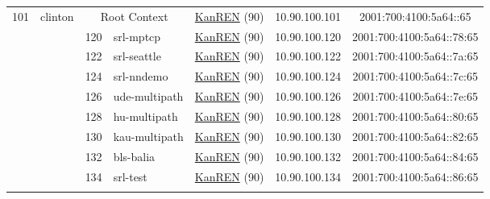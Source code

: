 \begin{small}
\begin{center}
\begin{longtable}{|c|c|c|c|c|c|c|c|}
 \multirow{13}{*}{\tiny{101}} & \multicolumn{1}{|l|}{\multirow{13}{*}{\tiny{clinton}}} & \multicolumn{2}{|c|}{\tiny{Root Context}} & \multicolumn{2}{|c|}{\tiny{\href{http://www.kanren.net}{KanREN} (90)}} & \tiny{10.90.100.101} & \tiny{2001:700:4100:5a64::65} \\* \cline{3-3}\cline{4-4}\cline{5-5}\cline{6-6}\cline{7-7}\cline{8-8}
  &  & \tiny{120} & \multicolumn{1}{|l|}{\tiny{srl-mptcp}} & \multicolumn{2}{|c|}{\tiny{\href{http://www.kanren.net}{KanREN} (90)}} & \tiny{10.90.100.120} & \tiny{2001:700:4100:5a64::78:65} \\* \cline{3-3}\cline{4-4}\cline{5-5}\cline{6-6}\cline{7-7}\cline{8-8}
  &  & \tiny{122} & \multicolumn{1}{|l|}{\tiny{srl-seattle}} & \multicolumn{2}{|c|}{\tiny{\href{http://www.kanren.net}{KanREN} (90)}} & \tiny{10.90.100.122} & \tiny{2001:700:4100:5a64::7a:65} \\* \cline{3-3}\cline{4-4}\cline{5-5}\cline{6-6}\cline{7-7}\cline{8-8}
  &  & \tiny{124} & \multicolumn{1}{|l|}{\tiny{srl-nndemo}} & \multicolumn{2}{|c|}{\tiny{\href{http://www.kanren.net}{KanREN} (90)}} & \tiny{10.90.100.124} & \tiny{2001:700:4100:5a64::7c:65} \\* \cline{3-3}\cline{4-4}\cline{5-5}\cline{6-6}\cline{7-7}\cline{8-8}
  &  & \tiny{126} & \multicolumn{1}{|l|}{\tiny{ude-multipath}} & \multicolumn{2}{|c|}{\tiny{\href{http://www.kanren.net}{KanREN} (90)}} & \tiny{10.90.100.126} & \tiny{2001:700:4100:5a64::7e:65} \\* \cline{3-3}\cline{4-4}\cline{5-5}\cline{6-6}\cline{7-7}\cline{8-8}
  &  & \tiny{128} & \multicolumn{1}{|l|}{\tiny{hu-multipath}} & \multicolumn{2}{|c|}{\tiny{\href{http://www.kanren.net}{KanREN} (90)}} & \tiny{10.90.100.128} & \tiny{2001:700:4100:5a64::80:65} \\* \cline{3-3}\cline{4-4}\cline{5-5}\cline{6-6}\cline{7-7}\cline{8-8}
  &  & \tiny{130} & \multicolumn{1}{|l|}{\tiny{kau-multipath}} & \multicolumn{2}{|c|}{\tiny{\href{http://www.kanren.net}{KanREN} (90)}} & \tiny{10.90.100.130} & \tiny{2001:700:4100:5a64::82:65} \\* \cline{3-3}\cline{4-4}\cline{5-5}\cline{6-6}\cline{7-7}\cline{8-8}
  &  & \tiny{132} & \multicolumn{1}{|l|}{\tiny{bls-balia}} & \multicolumn{2}{|c|}{\tiny{\href{http://www.kanren.net}{KanREN} (90)}} & \tiny{10.90.100.132} & \tiny{2001:700:4100:5a64::84:65} \\* \cline{3-3}\cline{4-4}\cline{5-5}\cline{6-6}\cline{7-7}\cline{8-8}
  &  & \tiny{134} & \multicolumn{1}{|l|}{\tiny{srl-test}} & \multicolumn{2}{|c|}{\tiny{\href{http://www.kanren.net}{KanREN} (90)}} & \tiny{10.90.100.134} & \tiny{2001:700:4100:5a64::86:65} \\* \cline{3-3}\cline{4-4}\cline{5-5}\cline{6-6}\cline{7-7}\cline{8-8}

\end{longtable}
\end{center}
\end{small}
